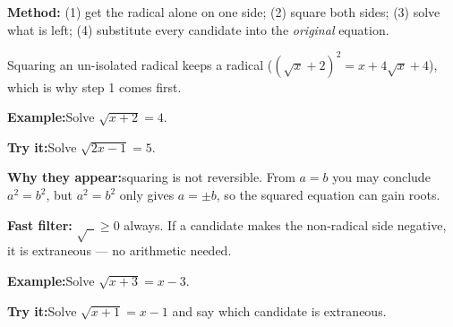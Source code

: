 \documentclass[12pt]{article}
\begin{document}

\begin{formulabox}\textbf{Method:}\quad
(1) get the radical alone on one side; (2) square both sides;
(3) solve what is left; (4) substitute every candidate into the
\emph{original} equation.\par
Squaring an un-isolated radical keeps a radical
($(\sqrt{x} + 2)^2 = x + 4\sqrt{x} + 4$), which is why step 1 comes first.
\end{formulabox}
\begin{examplebox}\textbf{Example:}\quad Solve $\sqrt{x + 2} = 4$.
\end{examplebox}
\begin{tryitbox}\textbf{Try it:}\quad Solve $\sqrt{2x - 1} = 5$.\\[2pt]
\end{tryitbox}

\begin{formulabox}\textbf{Why they appear:}\quad squaring is not reversible.
From $a = b$ you may conclude $a^2 = b^2$, but $a^2 = b^2$ only gives
$a = \pm b$, so the squared equation can gain roots.\par
\textbf{Fast filter:} $\sqrt{\;\;} \geq 0$ always. If a candidate makes the
non-radical side negative, it is extraneous --- no arithmetic needed.
\end{formulabox}
\begin{examplebox}\textbf{Example:}\quad Solve $\sqrt{x + 3} = x - 3$.
\end{examplebox}
\begin{tryitbox}\textbf{Try it:}\quad Solve $\sqrt{x + 1} = x - 1$ and say
which candidate is extraneous.\\[2pt]
\end{tryitbox}
\end{document}
